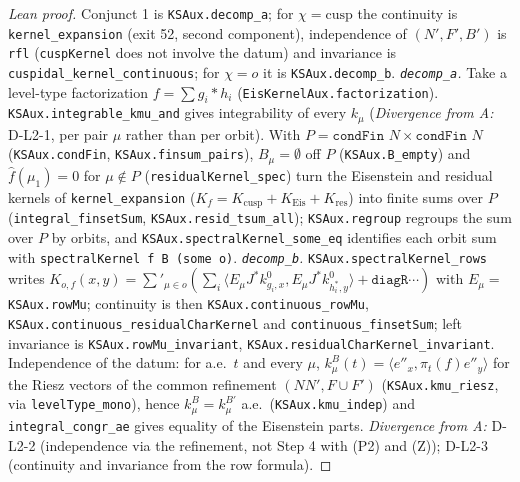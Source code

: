 \begin{proof}[Lean proof]
Conjunct 1 is \texttt{KSAux.decomp\_a}; for $\chi=\mathrm{cusp}$ the continuity is \texttt{kernel\_expansion} (exit 52, second component), independence of $(N',F',B')$ is \texttt{rfl} (\texttt{cuspKernel} does not involve the datum) and invariance is \texttt{cuspidal\_kernel\_continuous}; for $\chi=o$ it is \texttt{KSAux.decomp\_b}. \emph{\texttt{decomp\_a}.} Take a level-type factorization $f=\sum g_i\ast h_i$ (\texttt{EisKernelAux.factorization}). \texttt{KSAux.integrable\_kmu\_and} gives integrability of every $k_\mu$ (\emph{Divergence from A:} D-L2-1, per pair $\mu$ rather than per orbit). With $P=\texttt{condFin }N\times\texttt{condFin }N$ (\texttt{KSAux.condFin}, \texttt{KSAux.finsum\_pairs}), $B_\mu=\emptyset$ off $P$ (\texttt{KSAux.B\_empty}) and $\hat f(\mu_1)=0$ for $\mu\notin P$ (\texttt{residualKernel\_spec}) turn the Eisenstein and residual kernels of \texttt{kernel\_expansion} ($K_f=K_{\mathrm{cusp}}+K_{\mathrm{Eis}}+K_{\mathrm{res}}$) into finite sums over $P$ (\texttt{integral\_finsetSum}, \texttt{KSAux.resid\_tsum\_all}); \texttt{KSAux.regroup} regroups the sum over $P$ by orbits, and \texttt{KSAux.spectralKernel\_some\_eq} identifies each orbit sum with \texttt{spectralKernel f B (some o)}. \emph{\texttt{decomp\_b}.} \texttt{KSAux.spectralKernel\_rows} writes $K_{o,f}(x,y)=\sum'_{\mu\in o}(\sum_i\langle E_\mu J^*k^0_{g_i,x},E_\mu J^*k^0_{h_i^*,y}\rangle+\texttt{diagR}\cdots)$ with $E_\mu=$ \texttt{KSAux.rowMu}; continuity is then \texttt{KSAux.continuous\_rowMu}, \texttt{KSAux.continuous\_residualCharKernel} and \texttt{continuous\_finsetSum}; left invariance is \texttt{KSAux.rowMu\_invariant}, \texttt{KSAux.residualCharKernel\_invariant}. Independence of the datum: for a.e.\ $t$ and every $\mu$, $k^B_\mu(t)=\langle e''_x,\pi_t(f)e''_y\rangle$ for the Riesz vectors of the common refinement $(N N',F\cup F')$ (\texttt{KSAux.kmu\_riesz}, via \texttt{levelType\_mono}), hence $k^B_\mu=k^{B'}_\mu$ a.e.\ (\texttt{KSAux.kmu\_indep}) and \texttt{integral\_congr\_ae} gives equality of the Eisenstein parts. \emph{Divergence from A:} D-L2-2 (independence via the refinement, not Step 4 with (P2) and (Z)); D-L2-3 (continuity and invariance from the row formula).
\end{proof}

